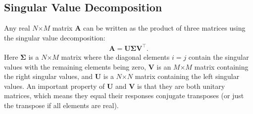 \subsection{Singular Value Decomposition} \label{Sec:linearAlgebra_singularValueDecomposition}

Any real $N$$\times$$M$ matrix $\mathbf{A}$ can be written as the product of three matrices using the singular value decomposition:
\begin{align} \label{Eqn:linearAlgebra_singularValueDecomposition}
  \mathbf{A} = \mathbf{U} \boldsymbol\Sigma \mathbf{V}^\top .
\end{align}
Here $\boldsymbol\Sigma$ is a $N$$\times$$M$ matrix where the diagonal elements $i = j$ contain the singular values with the remaining elements being zero, $\mathbf{V}$ is an $M$$\times$$M$ matrix containing the right singular values, and $\mathbf{U}$ is a $N$$\times$$N$ matrix containing the left singular values. An important property of $\mathbf{U}$ and $\mathbf{V}$ is that they are both unitary matrices, which means they equal their responses conjugate transposes (or just the transpose if all elements are real).

